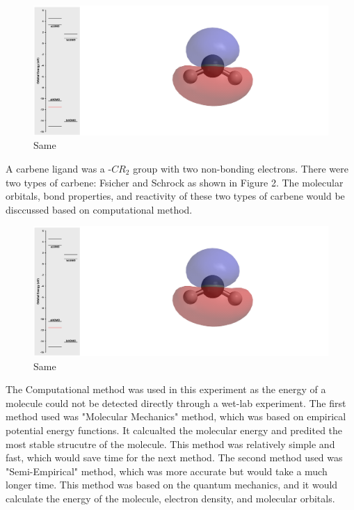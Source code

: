 \documentclass[twocolumn]{article} %
\begin{document}
\begin{figure}[h!]
      \centering
      \includegraphics[width=0.95\columnwidth]{CH2 HOMO-1.png} %
      \vspace{2mm} %
      \caption{Same}
\end{figure}

A carbene ligand was a -$CR_2$ group with two non-bonding electrons. There were two types of carbene: Fsicher and Schrock as shown in Figure 2. The molecular orbitals, bond properties, and reactivity of these two types of carbene would be disccussed based on computational method. 
\begin{figure}[h!]
      \centering
      \includegraphics[width=0.95\columnwidth]{CH2 HOMO-1.png} %
      \vspace{2mm} %
      \caption{Same}
\end{figure}

The Computational method was used in this experiment as the energy of a molecule could not be detected directly through a wet-lab experiment. The first method used was "Molecular Mechanics" method, which was based on empirical potential energy functions.\cite{MMFF1} It calcualted the molecular energy and predited the most stable strucutre of the molecule.\cite{MMFF2} This method was relatively simple and fast, which would save time for the next method. The second method used was "Semi-Empirical" method, which was more accurate but would take a much longer time. This method was based on the quantum mechanics, and it would calculate the energy of the molecule, electron density, and molecular orbitals. 
\end{document}
